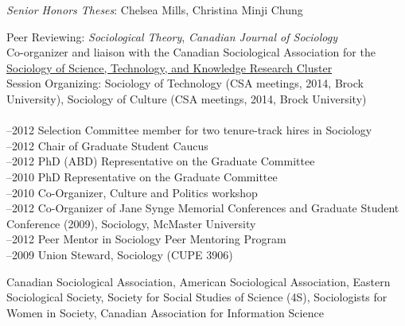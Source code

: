 \documentclass[11pt,usenames,dvipsnames]{article}
\begin{document}
\noindent \emph{Senior Honors Theses}: Chelsea Mills, Christina Minji Chung \\



\noindent Peer Reviewing: {\it Sociological Theory}, {\it Canadian Journal of Sociology}\\

\noindent Co-organizer and liaison with the Canadian Sociological Association for the \href{http://www.csa-scs.ca/files/webapps/csapress/stsk/}{Sociology of Science, Technology, and Knowledge Research Cluster}\\

\noindent Session Organizing: Sociology of Technology (CSA meetings, 2014, Brock University), Sociology of Culture (CSA meetings, 2014, Brock University) \\

\\
–2012 Selection Committee member for two tenure-track hires in Sociology\\
–2012 Chair of Graduate Student Caucus\\
–2012 PhD (ABD) Representative on the Graduate Committee\\
–2010 PhD Representative on the Graduate Committee\\
–2010 Co-Organizer, Culture and Politics workshop\\
–2012 Co-Organizer of Jane Synge Memorial Conferences and Graduate Student Conference (2009), Sociology, McMaster University\\
–2012 Peer Mentor in Sociology Peer Mentoring Program\\
–2009 Union Steward, Sociology (CUPE 3906)\\



\noindent Canadian Sociological Association, American Sociological Association, Eastern Sociological Society, Society for Social Studies of Science (4S), Sociologists for Women in Society, Canadian Association for Information Science \\
\end{document}
